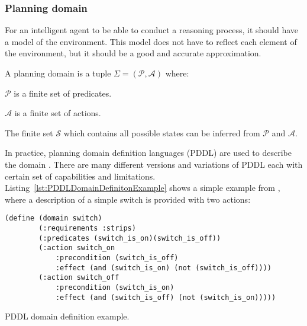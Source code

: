 \subsubsection{Planning domain}

For an intelligent agent to be able to conduct a reasoning process, 
it should have a model of the environment. 
This model does not have to reflect each element of the environment, 
but it should be a good and accurate approximation.
\begin{Tdef}

    A planning domain is a tuple $\Sigma= (\mathcal{P}, \mathcal{A})$ where:
    \vspace{-0.5em}
    \begin{compactitem}
        \item 
        $\mathcal{P}$ is a finite set of predicates.
        \item 
        $\mathcal{A}$ is a finite set of actions.
        \item 
        The finite set $\mathcal{S}$ which contains all possible states can be inferred from $\mathcal{P}$ and $\mathcal{A}$.
    \end{compactitem}
    \vspace{-0.5em}
\end{Tdef}

In practice, planning domain definition languages (PDDL) are used to describe the domain \cite{aeronautiques1998pddl}. There are many different versions and variations of PDDL each with certain set of capabilities and limitations. 
Listing~\ref{lst:PDDLDomainDefinitonExample} shows a simple example from \cite{IntroductionPlanningDomainhaslum2019}, where a description of a simple switch is provided with two actions:

\begin{Listing}
    \begin{lstlisting}[language=PDDL]
    (define (domain switch)
        (:requirements :strips)
        (:predicates (switch_is_on)(switch_is_off))
        (:action switch_on
            :precondition (switch_is_off)
            :effect (and (switch_is_on) (not (switch_is_off))))
        (:action switch_off
            :precondition (switch_is_on)
            :effect (and (switch_is_off) (not (switch_is_on)))))
  \end{lstlisting}
    \caption{PDDL domain definition example.}
    \label{lst:PDDLDomainDefinitonExample}
\end{Listing}


